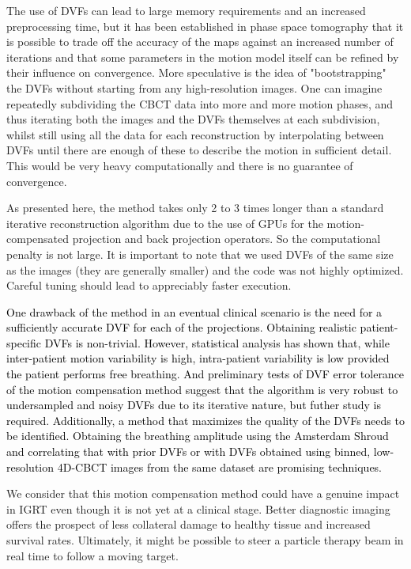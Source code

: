 The use of DVFs can lead to large memory requirements and an increased preprocessing time, but it has been established in phase space tomography that it is possible to trade off the accuracy of the maps against an increased number of iterations and that some parameters in the motion model itself can be refined by their influence on convergence\cite{pst1}\cite{pst2}.  More speculative is the idea of "bootstrapping" the DVFs without starting from any high-resolution images.  One can imagine repeatedly subdividing the CBCT data into more and more motion phases, and thus iterating both the images and the DVFs themselves at each subdivision, whilst still using all the data for each reconstruction by interpolating between DVFs until there are enough of these to describe the motion in sufficient detail.  This would be very heavy computationally and there is no guarantee of convergence.

As presented here, the method takes only 2 to 3 times longer than a standard iterative reconstruction algorithm due to the use of GPUs for the motion-compensated projection and back projection operators.  So the computational penalty is not large.  It is important to note that we used DVFs of the same size as the images (they are generally smaller) and the code was not highly optimized.  Careful tuning should lead to appreciably faster execution.

\textcolor{black}{One drawback of the method in an eventual clinical scenario is the need for a sufficiently accurate DVF for each of the projections. Obtaining realistic patient-specific DVFs is non-trivial.  However, statistical analysis\cite{Sonke2008590}\cite{0031-9155-51-17-003} has shown that, while inter-patient motion variability is high, intra-patient variability is low provided the patient performs free breathing.  And preliminary tests of DVF error tolerance of the motion compensation method suggest that the algorithm is very robust to undersampled and noisy DVFs due to its iterative nature, but futher study is required.  Additionally, a method that maximizes the quality of the DVFs needs to be identified. Obtaining the breathing amplitude using the Amsterdam Shroud\cite{0031-9155-58-5-1447} and correlating that with prior DVFs or with DVFs obtained using binned, low-resolution 4D-CBCT images from the same dataset are promising techniques.}

We consider that this motion compensation method could have a genuine impact in IGRT even though it is not yet at a clinical stage.  Better diagnostic imaging offers the prospect of less collateral damage to healthy tissue and increased survival rates.  Ultimately, it might be possible to steer a particle therapy beam in real time to follow a moving target. 



